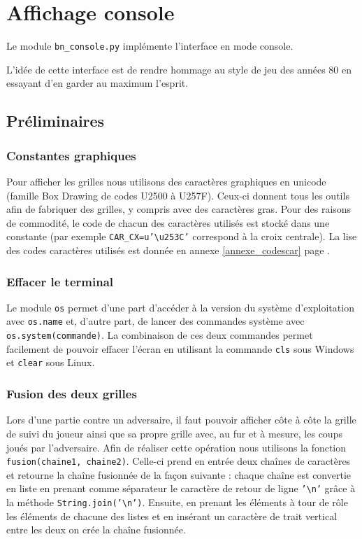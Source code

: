 \chapter{Affichage console}
Le module \texttt{bn\_console.py} implémente l'interface en mode console.

L'idée de cette interface est de rendre hommage au style de jeu des années 80 en essayant d'en garder au maximum l'esprit.

\section{Préliminaires}
\subsection{Constantes graphiques}
Pour afficher les grilles nous utilisons des caractères graphiques en unicode (famille Box Drawing de codes U2500 à U257F). Ceux-ci donnent tous les outils afin de fabriquer des grilles, y compris avec des caractères gras. Pour des raisons de commodité, le code de chacun des caractères utilisés est stocké dans une constante (par exemple \texttt{CAR\_CX=u'\textbackslash u253C'} correspond à la croix centrale). La lise des codes caractères utilisés est donnée en annexe \ref{annexe_codescar} page \pageref{annexe_codescar}.

\subsection{Effacer le terminal}
Le module \texttt{os} permet d'une part d'accéder à la version du système d'exploitation avec \texttt{os.name} et, d'autre part, de lancer des commandes système avec \texttt{os.system(commande)}. La combinaison de ces deux commandes permet facilement de pouvoir effacer l'écran en utilisant la commande \texttt{cls} sous Windows et \texttt{clear} sous Linux.

\subsection{Fusion des deux grilles}
Lors d'une partie contre un adversaire, il faut pouvoir afficher côte à côte la grille de suivi du joueur ainsi que sa propre grille avec, au fur et à mesure, les coups joués par l'adversaire. Afin de réaliser cette opération nous utilisons la fonction \texttt{fusion(chaine1, chaine2)}. Celle-ci prend en entrée deux chaînes de caractères et retourne la chaîne fusionnée de la façon suivante : chaque chaîne est convertie en liste en prenant comme séparateur le caractère de retour de ligne \texttt{'\textbackslash n'} grâce à la méthode \texttt{String.join('\textbackslash n')}. Ensuite, en prenant les éléments à tour de rôle les éléments de chacune des listes et en insérant un caractère de trait vertical entre les deux on crée la chaîne fusionnée. 

